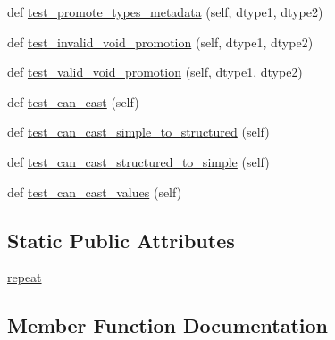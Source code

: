 \begin{DoxyCompactItemize}
\item 
def \hyperlink{classnumpy_1_1core_1_1tests_1_1test__numeric_1_1TestTypes_a60e93d19c89f8d9d2fb2b3b35ab23a6a}{test\+\_\+promote\+\_\+types\+\_\+metadata} (self, dtype1, dtype2)
\item 
def \hyperlink{classnumpy_1_1core_1_1tests_1_1test__numeric_1_1TestTypes_a55028c50836532dfecf0fe01077a33ac}{test\+\_\+invalid\+\_\+void\+\_\+promotion} (self, dtype1, dtype2)
\item 
def \hyperlink{classnumpy_1_1core_1_1tests_1_1test__numeric_1_1TestTypes_adac2ef974c9af5869ea5d35dc90ca08e}{test\+\_\+valid\+\_\+void\+\_\+promotion} (self, dtype1, dtype2)
\item 
def \hyperlink{classnumpy_1_1core_1_1tests_1_1test__numeric_1_1TestTypes_af977add3ae354c23e31f4b1e6a5ec190}{test\+\_\+can\+\_\+cast} (self)
\item 
def \hyperlink{classnumpy_1_1core_1_1tests_1_1test__numeric_1_1TestTypes_a91569b2f1d6288eb89809356ee62c456}{test\+\_\+can\+\_\+cast\+\_\+simple\+\_\+to\+\_\+structured} (self)
\item 
def \hyperlink{classnumpy_1_1core_1_1tests_1_1test__numeric_1_1TestTypes_a21e72198f4470bb65f1a6c995e48f034}{test\+\_\+can\+\_\+cast\+\_\+structured\+\_\+to\+\_\+simple} (self)
\item 
def \hyperlink{classnumpy_1_1core_1_1tests_1_1test__numeric_1_1TestTypes_ada375ddabd7360c164ca2a074a810abd}{test\+\_\+can\+\_\+cast\+\_\+values} (self)
\end{DoxyCompactItemize}
\subsection*{Static Public Attributes}
\begin{DoxyCompactItemize}
\item 
\hyperlink{classnumpy_1_1core_1_1tests_1_1test__numeric_1_1TestTypes_a8b7f9c309e4a4f9bdd62175cbd6eb051}{repeat}
\end{DoxyCompactItemize}


\subsection{Member Function Documentation}
\mbox{\label{classnumpy_1_1core_1_1tests_1_1test__numeric_1_1TestTypes_a4077739b913721b1751b935f71adc673}} 
